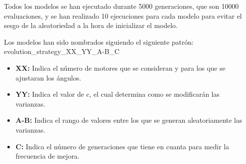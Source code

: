 \documentclass[12pt, spanish, pdftex]{UC3M_document}
\begin{document}
Todos los modelos se han ejecutado durante 5000 generaciones, que son 10000 evaluaciones, y se han realizado 10 ejecuciones para cada modelo para evitar el sesgo de la aleatoriedad a la hora de inicializar el modelo.

Los modelos han sido nombrados siguiendo el siguiente patrón: evolution\_strategy\_XX\_YY\_A-B\_C
\begin{itemize}
	\item \textbf{XX:} Indica el número de motores que se consideran y para los que se ajustaran los ángulos.
	\item \textbf{YY:} Indica el valor de c, el cual determina como se modificarán las varianzas.
	\item \textbf{A-B:} Indica el rango de valores entre los que se generan aleatoriamente las varianzas.
	\item \textbf{C:} Indica el número de generaciones que tiene en cuanta para medir la frecuencia de mejora.
\end{itemize}
\end{document}
